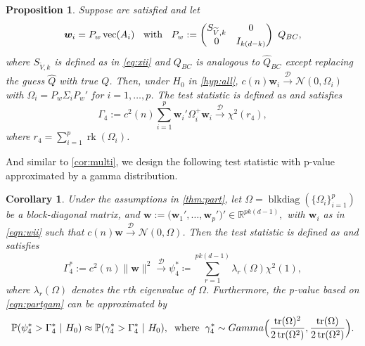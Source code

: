 \documentclass[12pt]{article}
\numberwithin{thm}{section}
\numberwithin{defn}{section}
\numberwithin{lem}{section}
\newtheorem{prop}{Proposition}
\numberwithin{prop}{section}
\newtheorem{cor}{Corollary}
\numberwithin{cor}{section}
\numberwithin{rem}{section}
\DeclareMathOperator{\Vector}{vec}
\DeclareMathOperator{\tr}{tr}
\DeclareMathOperator{\blkdiag}{blkdiag}
\newcommand{\rank}{\operatorname{rk}}
\begin{document}
\begin{prop}\label{thm:part}
Suppose  are satisfied and let
\begin{equation}\label{eqn:wii}
\bm{w}_i =  P_w \Vector(A_i) 
\hspace{0.2cm} \text{ with } \hspace{0.2cm}
P_w := \begin{pmatrix} S_{\widetilde{V}, k} & 0 \\ 0 & I_{k(d-k)} \end{pmatrix} ~ Q_{BC},
\end{equation}
where $S_{\widetilde{V}, k}$ is defined as in \eqref{eq:xii} and $Q_{BC}$ is analogous to $\widehat{Q}_{BC}$ except replacing the guess $\widehat{Q}$ with true $Q$.
Then, under $H_{0}$ in \eqref{hyp:all},
$
    c(n) \bm{w}_i \xrightarrow{\mathcal{D}} \mathcal{N}(0, \Omega_i) \label{eqn:partnorm}
$
with $\Omega_i = P_w \Sigma_i P_w'$ for $i = 1, \dots, p$. The test statistic is defined as and satisfies
\begin{equation}
    \Gamma_4 := c^2(n) \sum_{i = 1}^p \bm{w}_i' \Omega_i^+ \bm{w}_i \xrightarrow{\mathcal{D}} \chi^2(r_4),\label{eqn:partchi}
\end{equation}
where $r_4 = \sum_{i=1}^p \rank(\Omega_i)$.
\end{prop}

And similar to \autoref{cor:multi}, we design the following test statistic with p-value approximated by a gamma distribution.
\begin{cor}\label{cor:partial}
Under the assumptions in \autoref{thm:part}, let $\Omega = \blkdiag(\{\Omega_i\}_{i = 1}^p)$ be a block-diagonal matrix, and
$
\bm{w} := \big(\bm{w}_1', \dots, \bm{w}_p' \big)' \in \mathbb{R}^{pk(d-1)},
$ with $\bm{w}_{i}$ as in \eqref{eqn:wii} such that $c(n) \bm{w} \xrightarrow{\mathcal{D}} \mathcal{N}(0, \Omega)$. Then the test statistic is defined as and satisfies
\begin{equation}\label{eqn:partgam}
    \Gamma^*_4 := c^2(n) \|\bm{w}\|^2
    \xrightarrow{\mathcal{D}} \psi_4^* \coloneqq
    \sum_{r=1}^{pk(d-1)} \lambda_{r}(\Omega) \chi^2(1),
\end{equation}
where $\lambda_r(\Omega)$ denotes the $r$th eigenvalue of $\Omega$. Furthermore, the p-value based on \eqref{eqn:partgam} can be approximated by
\begin{equation}\label{eqn:part_approx}
    \mathbb{P}(\psi_4^* > \Gamma_4^* ~|~ H_0) \approx \mathbb{P}(\gamma_4^* > \Gamma_4^* ~|~ H_0), \hspace{0.2cm} \mbox{where} \hspace{0.2cm} \gamma_4^* \sim Gamma\Big(\frac{\tr(\Omega)^2}{2 \tr(\Omega^2)}, \frac{\tr(\Omega)}{2 \tr(\Omega^2)}\Big).
\end{equation}
\end{cor}
\end{document}
